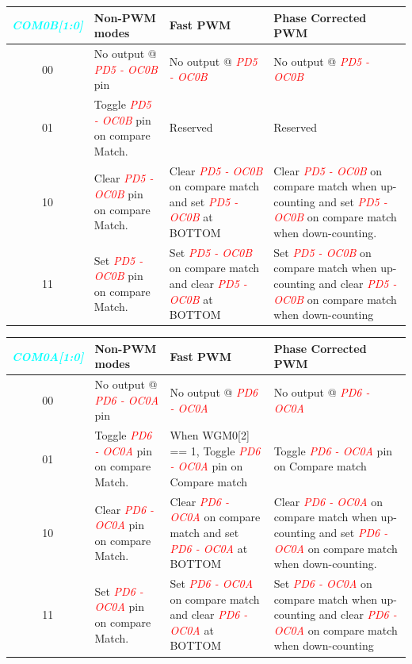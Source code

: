 \documentclass{article}
\newcommand{\bitFormat}[1]{\emph{\textbf{\textcolor{cyan}{#1}}}}
\newcommand{\pinFormat}[1]{\emph{\textcolor{red}{#1}}}
\begin{document}
\begin{table}[H]
    \begin{center}
        \begin{tabular}{c|p{4cm}|p{5.2cm}|p{5.2cm}}
            \bitFormat{COM0B[1:0]} & \textbf{Non-PWM modes} & \textbf{Fast PWM} & \textbf{Phase Corrected PWM}\\
            \hline
            00 & No output @ \pinFormat{PD5 - OC0B} pin &  No output @ \pinFormat{PD5 - OC0B} & No output @ \pinFormat{PD5 - OC0B}\\
            \hline
            01 & Toggle \pinFormat{PD5 - OC0B} pin on compare Match. & Reserved & Reserved\\
            \hline
            10 & Clear \pinFormat{PD5 - OC0B} pin on compare Match. & Clear \pinFormat{PD5 - OC0B} on compare match and  set \pinFormat{PD5 - OC0B} at BOTTOM & Clear \pinFormat{PD5 - OC0B} on compare match when up-counting and set \pinFormat{PD5 - OC0B} on compare match when down-counting.\\
            \hline
            11 & Set \pinFormat{PD5 - OC0B} pin on compare Match. & Set \pinFormat{PD5 - OC0B} on compare match and clear \pinFormat{PD5 - OC0B} at BOTTOM & Set \pinFormat{PD5 - OC0B} on compare match when up-counting and clear \pinFormat{PD5 - OC0B} on compare match when down-counting\\
        \end{tabular}
    \end{center}
\end{table}

\begin{table}[H]
    \begin{center}
        \begin{tabular}{c|p{4cm}|p{5.2cm}|p{5.2cm}}
            \bitFormat{COM0A[1:0]} & \textbf{Non-PWM modes} & \textbf{Fast PWM} & \textbf{Phase Corrected PWM}\\
            \hline
            00 & No output @ \pinFormat{PD6 - OC0A} pin &  No output @ \pinFormat{PD6 - OC0A} & No output @ \pinFormat{PD6 - OC0A}\\
            \hline
            01 & Toggle \pinFormat{PD6 - OC0A} pin on compare Match. & When WGM0[2] == 1, Toggle \pinFormat{PD6 - OC0A}  pin on Compare match & Toggle \pinFormat{PD6 - OC0A}  pin on Compare match\\
            \hline
            10 & Clear \pinFormat{PD6 - OC0A} pin on compare Match. & Clear \pinFormat{PD6 - OC0A} on compare match and  set \pinFormat{PD6 - OC0A} at BOTTOM & Clear \pinFormat{PD6 - OC0A} on compare match when up-counting and set \pinFormat{PD6 - OC0A} on compare match when down-counting.\\
            \hline
            11 & Set \pinFormat{PD6 - OC0A} pin on compare Match. & Set \pinFormat{PD6 - OC0A} on compare match and  clear \pinFormat{PD6 - OC0A} at BOTTOM & Set \pinFormat{PD6 - OC0A} on compare match when up-counting and clear \pinFormat{PD6 - OC0A} on compare match when down-counting\\
        \end{tabular}
    \end{center}
\end{table}
\end{document}
